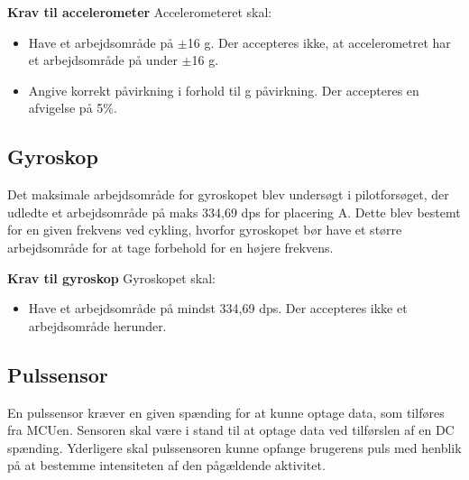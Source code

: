 \textbf{Krav til accelerometer} \newline 
Accelerometeret skal:
\begin{itemize}
\item Have et arbejdsområde på $\pm$16 g. Der accepteres ikke, at accelerometret har et arbejdsområde på under $\pm$16 g.
\item Angive korrekt påvirkning i forhold til g påvirkning. Der accepteres en afvigelse på 5\%.
\end{itemize}

\subsection{Gyroskop} \label{krav:gyro}
Det maksimale arbejdsområde for gyroskopet blev undersøgt i pilotforsøget, der udledte et arbejdsområde på maks 334,69 dps for placering A. Dette blev bestemt for en given frekvens ved cykling, hvorfor gyroskopet bør have et større arbejdsområde for at tage forbehold for en højere frekvens. %

\textbf{Krav til gyroskop} \newline
Gyroskopet skal:
\begin{itemize}
\item Have et arbejdsområde på mindst 334,69 dps. Der accepteres ikke et arbejdsområde herunder.
\end{itemize}

\subsection{Pulssensor} \label{puls_krav}
En pulssensor kræver en given spænding for at kunne optage data, som tilføres fra MCUen. Sensoren skal være i stand til at optage data ved tilførslen af en DC spænding. %
Yderligere skal pulssensoren kunne opfange brugerens puls med henblik på at bestemme intensiteten af den pågældende aktivitet.


